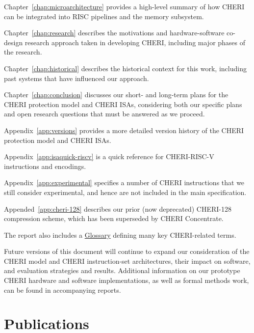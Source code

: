 \medskip
\noindent
Chapter~\ref{chap:microarchitecture} provides a high-level summary of how
CHERI can be integrated into RISC pipelines and the memory subsystem.

\medskip
\noindent
Chapter~\ref{chap:research} describes the motivations and hardware-software
co-design research approach taken in developing CHERI, including major phases of
the research.

\medskip
\noindent
Chapter~\ref{chap:historical} describes the historical context for this work,
including past systems that have influenced our approach.

\medskip
\noindent
Chapter~\ref{chap:conclusion} discusses our short- and long-term plans for the
CHERI protection model and CHERI ISAs, considering both our specific plans
and open research questions that must be answered as we proceed.

\medskip
\noindent
Appendix~\ref{app:versions} provides a more detailed version history of the
CHERI protection model and CHERI ISAs.

\medskip
\noindent
Appendix~\ref{app:isaquick-riscv} is a quick reference for CHERI-RISC-V
instructions and encodings.

\medskip
\noindent
Appendix~\ref{app:experimental} specifies a number of CHERI instructions
that we still consider experimental, and hence are not included in the main
specification.

\medskip
\noindent
Appended~\ref{app:cheri-128} describes our prior (now deprecated) CHERI-128
compression scheme, which has been superseded by CHERI Concentrate.

\medskip
\noindent
The report also includes a \hyperref[glossary]{Glossary} defining many key
CHERI-related terms.

\medskip

Future versions of this document will continue to expand our
consideration of the CHERI model and CHERI instruction-set architectures,
their impact on software, and evaluation strategies and results.
Additional information on our prototype CHERI hardware and software
implementations, as well as formal methods work, can be found in accompanying
reports.

\section{Publications}
\label{sec:publications}

